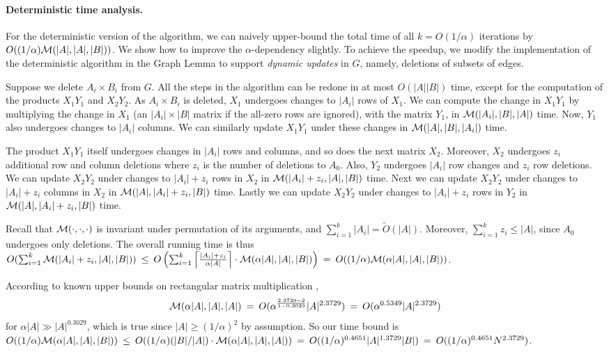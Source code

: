 \documentclass[11pt]{article}
\newcommand{\OO}{\widetilde{O}}
\begin{document}
{\paragraph{Deterministic time analysis.}
For the deterministic version of the algorithm,
we can naively upper-bound the total time of all
$k=O(1/\alpha)$ iterations by $O((1/\alpha){\cal M}(|A|,|A|,|B|))$.
We show how to improve the $\alpha$-dependency slightly.
To achieve the speedup, we modify the implementation
of the deterministic algorithm in
the Graph Lemma to support \emph{dynamic updates}
in $G$, namely, deletions of subsets of edges.

Suppose we delete $A_i\times B_i$ from $G$.
All the steps in the algorithm can be redone in
at most $O(|A||B|)$ time,
except for the computation of the products $X_1Y_1$
and $X_2Y_2$.  As $A_i\times B_i$ is deleted, $X_1$
undergoes changes to $|A_i|$
rows of $X_1$.  We can compute the
change in $X_1Y_1$ by multiplying the change in $X_1$
(an $|A_i|\times|B|$ matrix if the all-zero rows are ignored),
with the matrix $Y_1$, in ${\cal M}(|A_i|,|B|,|A|)$ time.
Now, $Y_1$ also undergoes changes to $|A_i|$ columns.
We can similarly update $X_1Y_1$ under these changes
in ${\cal M}(|A|,|B|,|A_i|)$ time.

The product $X_1Y_1$ itself
undergoes changes in $|A_i|$ rows and columns, and so does
the next matrix $X_2$.  Moreover, $X_2$ undergoes $z_i$
additional row and column deletions where $z_i$ is the number of
deletions to $A_0$.  Also, $Y_2$ undergoes
$|A_i|$ row changes and $z_i$ row deletions.
We can update $X_2Y_2$
under changes to $|A_i|+z_i$ rows in $X_2$ in
${\cal M}(|A_i|+z_i,|A|,|B|)$ time.  Next we can update $X_2Y_2$
under changes to $|A_i|+z_i$ columns in $X_2$ in
${\cal M}(|A|,|A_i|+z_i,|B|)$ time.   Lastly we can update $X_2Y_2$ under
changes to $|A_i|+z_i$ rows in $Y_2$ in ${\cal M}(|A|,|A_i|+z_i,|B|)$ time.

Recall that ${\cal M}(\cdot,\cdot,\cdot)$ is invariant under
permutation of its arguments, and $\sum_{i=1}^k |A_i| = \OO(|A|)$.  Moreover, $\sum_{i=1}^k z_i\le |A|$,
since $A_0$ undergoes only deletions.
The overall running time is
thus $O(\sum_{i=1}^k {\cal M}(|A_i|+z_i,|A|,|B|))
\:\le\: O\left(\sum_{i=1}^k \left\lceil \frac{|A_i|+z_i}{\alpha |A|}\right\rceil\cdot {\cal M}(\alpha |A|,|A|,|B|)\right) \:=\: O((1/\alpha) {\cal M}(\alpha|A|,|A|,|B|))$.


According to known upper bounds on rectangular matrix multiplication \cite{HuangPan,LeGall1,LeGall2,Vas},
$${\cal M}(\alpha |A|, |A|,|A|)\:=\: O(\alpha^{\frac{2.3729-2}{1-0.3029}} |A|^{2.3729})\:=\:O(\alpha^{0.5349}|A|^{2.3729})$$ for
$\alpha |A| \gg |A|^{0.3029}$, which is true
since $|A|\ge (1/\alpha)^2$ by assumption.
So our time bound is
$O((1/\alpha) {\cal M}(\alpha|A|,|A|,|B|))
\:\le\:O((1/\alpha) (|B|/|A|)\cdot {\cal M}(\alpha|A|,|A|,|A|))
\:=\:O((1/\alpha)^{0.4651}|A|^{1.3729}|B|) \:=\:
O((1/\alpha)^{0.4651} N^{2.3729})$.



}
\end{document}
